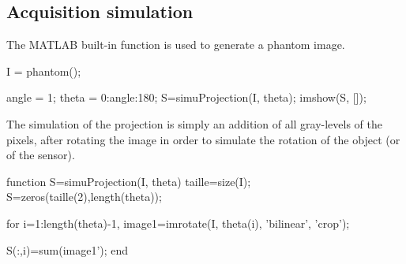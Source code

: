 \def\QRCODE{tp_en_attente_TUT.IMG.tomography_matlabqrcode.png}
\def\QRPAGE{http://www.iptutorials.science/tree/master/tp_en_attente/TUT.IMG.tomography/matlab}


\subsection{Acquisition simulation}

The MATLAB built-in function is used to generate a phantom image.

\begin{matlab}
I = phantom();

angle = 1;
theta = 0:angle:180;
S=simuProjection(I, theta);
imshow(S, []);
\end{matlab}

The simulation of the projection is simply an addition of all gray-levels of the pixels, after rotating the image in order to simulate the rotation of the object (or of the sensor).

\begin{matlab}
function S=simuProjection(I, theta)
taille=size(I);
S=zeros(taille(2),length(theta));

for i=1:length(theta)-1,
    image1=imrotate(I, theta(i), 'bilinear', 'crop');
  
    S(:,i)=sum(image1');
end
\end{matlab}


